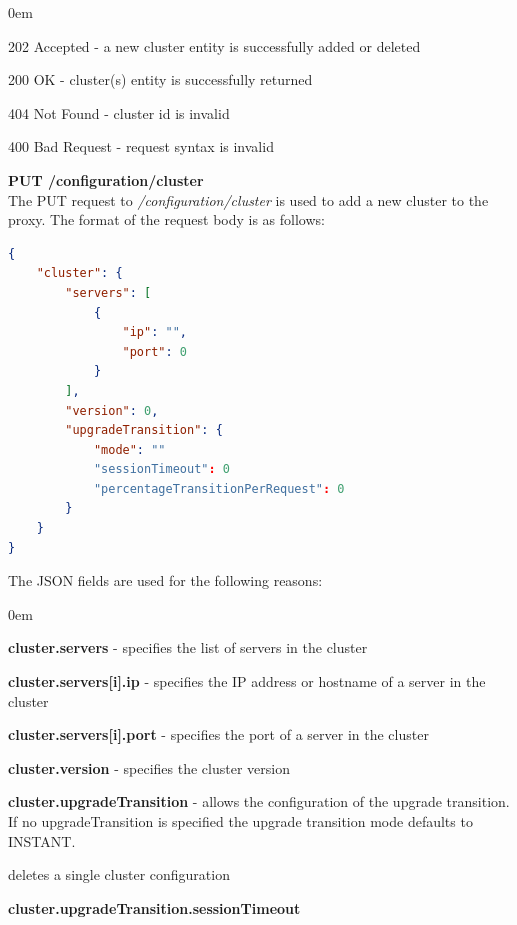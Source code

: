 \documentclass[a4paper,11pt,twoside]{article}
\begin{document}
\begin{list}{-}{}
  \itemsep0em
  \item{202 Accepted}  -  a new cluster entity is successfully added or deleted
  
  \item{200 OK} -  cluster(s) entity is successfully returned
  
   \item{404 Not Found} - cluster id is invalid
   
    \item{400 Bad Request } - request syntax is invalid
  
\end{list}

\noindent 
\textbf{PUT /configuration/cluster}\\
The PUT request to \textit{/configuration/cluster}  is used to add a new cluster to the proxy. The format of the request body is as follows:

\begin{lstlisting}[language=json,firstnumber=1]
{
    "cluster": {
        "servers": [
            {
                "ip": "", 
                "port": 0
            }
        ], 
        "version": 0, 
        "upgradeTransition": {
            "mode": ""
            "sessionTimeout": 0  
            "percentageTransitionPerRequest": 0 
        }
    }
}
\end{lstlisting}

\noindent
The JSON fields are used for the following reasons:

\begin{list}{-}{}
  \itemsep0em
  \item\textbf{{cluster.servers}} - specifies the list of servers in the cluster
  
  \item\textbf{{cluster.servers[i].ip}} - specifies the IP address or hostname of a server in the cluster
  
   \item\textbf{{cluster.servers[i].port}} - specifies the port of a server in the cluster
   
      \item\textbf{{cluster.version}} - specifies the cluster version 
   
   \item\textbf{{cluster.upgradeTransition}} - allows the configuration of the upgrade transition. If no upgradeTransition is specified the upgrade transition mode defaults to INSTANT.  
   
   
   
   deletes a single cluster configuration
   
    \item\textbf{{cluster.upgradeTransition.sessionTimeout}}
    
 
    
  
\end{list}
\end{document}
